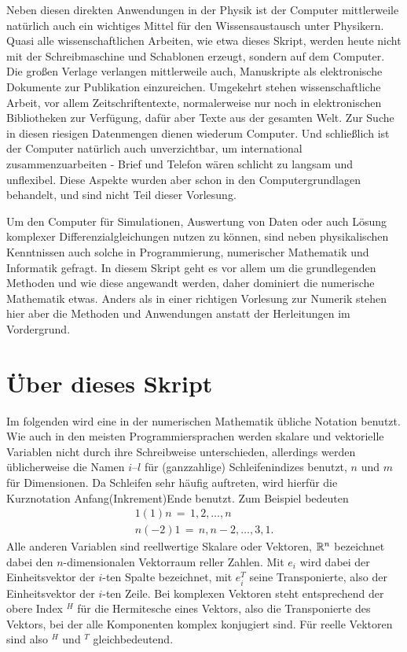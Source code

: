 Neben diesen direkten Anwendungen in der Physik ist der Computer
mittlerweile natürlich auch ein wichtiges Mittel für den
Wissensaustausch unter Physikern. Quasi alle wissenschaftlichen
Arbeiten, wie etwa dieses Skript, werden heute nicht mit der
Schreibmaschine und Schablonen erzeugt, sondern auf dem Computer. Die
großen Verlage verlangen mittlerweile auch, Manuskripte als
elektronische Dokumente zur Publikation einzureichen. Umgekehrt stehen
wissenschaftliche Arbeit, vor allem Zeitschriftentexte, normalerweise
nur noch in elektronischen Bibliotheken zur Verfügung, dafür aber
Texte aus der gesamten Welt. Zur Suche in diesen riesigen Datenmengen
dienen wiederum Computer. Und schließlich ist der Computer natürlich
auch unverzichtbar, um international zusammenzuarbeiten - Brief und
Telefon wären schlicht zu langsam und unflexibel. Diese Aspekte wurden
aber schon in den Computergrundlagen behandelt, und sind nicht Teil
dieser Vorlesung.

Um den Computer für Simulationen, Auswertung von Daten oder auch
Lösung komplexer Differenzialgleichungen nutzen zu können, sind neben
physikalischen Kenntnissen auch solche in Programmierung, numerischer
Mathematik und Informatik gefragt. In diesem Skript geht es vor allem
um die grundlegenden Methoden und wie diese angewandt werden, daher
dominiert die numerische Mathematik etwas. Anders als in einer
richtigen Vorlesung zur Numerik stehen hier aber die Methoden und
Anwendungen anstatt der Herleitungen im Vordergrund.

\section{Über dieses Skript}

Im folgenden wird eine in der numerischen Mathematik übliche Notation
benutzt. Wie auch in den meisten Programmiersprachen werden skalare
und vektorielle Variablen nicht durch ihre Schreibweise unterschieden,
allerdings werden üblicherweise die Namen $i$--$l$ für (ganzzahlige)
Schleifenindizes benutzt, $n$ und $m$ für Dimensionen. Da Schleifen sehr
häufig auftreten, wird hierfür die Kurznotation Anfang(Inkrement)Ende
benutzt. Zum Beispiel bedeuten
\begin{align*}
  1(1)n\,=\,1,2,\ldots, n\\
  n(-2)1\,=\,n, n-2,\ldots, 3, 1.
\end{align*}
Alle anderen Variablen sind reellwertige Skalare oder Vektoren,
$\mathbb{R}^n$ bezeichnet dabei den $n$-dimensionalen Vektorraum reller
Zahlen. Mit $e_i$ wird dabei der Einheitsvektor der $i$-ten Spalte
bezeichnet, mit $e_i^T$ seine Transponierte, also der Einheitsvektor
der $i$-ten Zeile. Bei komplexen Vektoren steht entsprechend der obere
Index $^H$ für die Hermitesche eines Vektors, also die Transponierte
des Vektors, bei der alle Komponenten komplex konjugiert sind. Für
reelle Vektoren sind also $^H$ und $^T$ gleichbedeutend.

